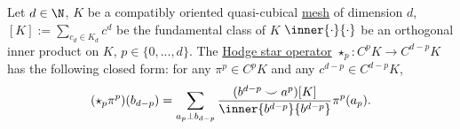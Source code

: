 \begin{proposition}
  Let
    $d \in \N$,
    $K$ be a compatibly oriented quasi-cubical
    \hyperref[cmc:mesh:definition]{mesh} of dimension $d$,
    $[K] := \sum_{c_d \in K_d} c^d$ be the fundamental class of $K$
    $\inner{\cdot}{\cdot}$ be an orthogonal inner product on $K$,
    $p \in \{0, ..., d\}$.
  The \hyperref[cmc/mesh/quasi_cubical/hodge_star/concept-definition]
               {Hodge star operator}
  $\star_p \colon C^p K \to C^{d - p} K$ has the following closed form:
  for any $\pi^p \in C^p K$ and any $c^{d - p} \in C^{d - p} K$,
  \begin{equation}
    (\star_p \pi^p)(b_{d - p})
    = \sum_{a_p \perp b_{d - p}}
        \frac{(b^{d - p} \smile a^p)[K]}{\inner{b^{d - p}}{b^{d - p}}}
        \pi^p(a_p).
  \end{equation}
\end{proposition}
